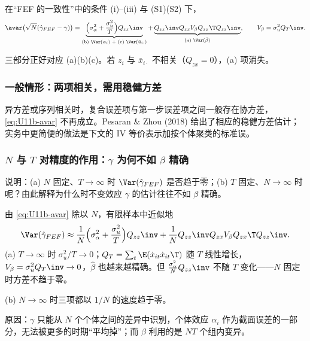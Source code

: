 \begin{thm}\label{thm:U11b-fefavar}
在“FEF 的一致性”中的条件 (i)--(iii) 与 (S1)(S2) 下，
\begin{equation}\label{eq:U11b-avar}
\avar\bigl(\sqrt N(\hat\gamma_{FEF}-\gamma)\bigr)=\underbrace{\Bigl(\sigma_\alpha^2+\frac{\sigma_u^2}{T}\Bigr)Q_{zz}\inv}_{\text{(b) }\Var(\alpha_i)\text{ + (c) }\Var(\bar u_{i\cdot})}+\underbrace{Q_{zz}\inv Q_{zx}V_\beta Q_{zx}\T Q_{zz}\inv}_{\text{(a) }\Var(\hat\beta)},\qquad V_\beta=\sigma_u^2Q_T\inv .
\end{equation}
\end{thm}
三部分正好对应 (a)(b)(c)。若 $z_i$ 与 $\bar x_{i\cdot}$ 不相关（$Q_{zx}=0$），(a) 项消失。

\subsubsection{一般情形：两项相关，需用稳健方差}

异方差或序列相关时，复合误差项与第一步误差项之间一般存在协方差，\eqref{eq:U11b-avar} 不再成立。Pesaran \& Zhou (2018) 给出了相应的稳健方差估计；实务中更简便的做法是下文的 IV 等价表示加按个体聚类的标准误。

\subsubsection{\texorpdfstring{$N$}{N} 与 \texorpdfstring{$T$}{T} 对精度的作用：\texorpdfstring{$\gamma$}{gamma} 为何不如 \texorpdfstring{$\beta$}{beta} 精确}

\begin{prac}\label{pr:U11b-fefprec}
说明：(a) $N$ 固定、$T\to\infty$ 时 $\Var(\hat\gamma_{FEF})$ 是否趋于零；(b) $T$ 固定、$N\to\infty$ 时呢？由此解释为什么时不变效应 $\gamma$ 的估计往往不如 $\beta$ 精确。

\answer 由 \eqref{eq:U11b-avar} 除以 $N$，有限样本中近似地
\[
\Var(\hat\gamma_{FEF})\approx\frac1N\Bigl(\sigma_\alpha^2+\frac{\sigma_u^2}T\Bigr)Q_{zz}\inv+\frac1NQ_{zz}\inv Q_{zx}V_\beta Q_{zx}\T Q_{zz}\inv .
\]
(a) $T\to\infty$ 时 $\sigma_u^2/T\to0$；$Q_T=\sum_t\E(\dot x_{it}\dot x_{it}\T)$ 随 $T$ 线性增长，$V_\beta=\sigma_u^2Q_T\inv\to0$，$\hat\beta$ 也越来越精确。但 $\frac{\sigma_\alpha^2}NQ_{zz}\inv$ 不随 $T$ 变化——$N$ 固定时方差不趋于零。

(b) $N\to\infty$ 时三项都以 $1/N$ 的速度趋于零。

原因：$\gamma$ 只能从 $N$ 个个体之间的差异中识别，个体效应 $\alpha_i$ 作为截面误差的一部分，无法被更多的时期“平均掉”；而 $\beta$ 利用的是 $NT$ 个组内变异。
\end{prac}

